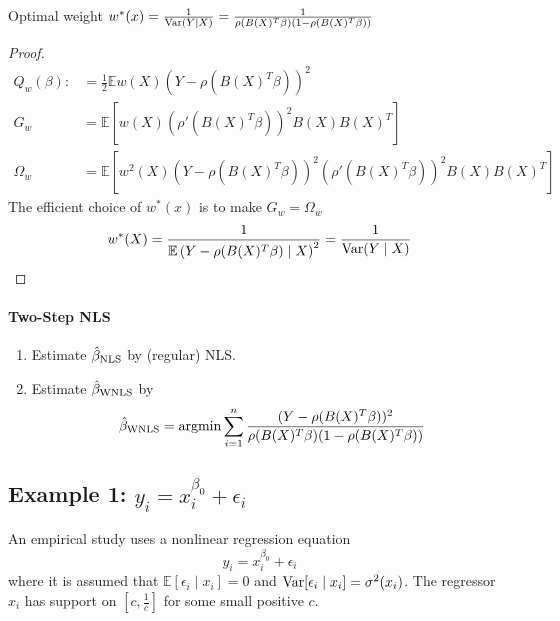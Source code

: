 \documentclass[11pt]{elegantbook}
\newcommand{\argmin}{\operatornamewithlimits{argmin}}
\begin{document}
\begin{claim}
    Optimal weight $w^*(x)=\frac{1}{\textnormal{Var}(Y|X)}=\frac{1}{\rho(B(X)^T\beta)(1-\rho(B(X)^T\beta))}$
\end{claim}
\begin{proof}
    \begin{equation}
        \begin{aligned}
            Q_w(\beta):&=\frac{1}{2}\mathbb{E}w(X)(Y-\rho(B(X)^T\beta))^2\\
            G_w&=\mathbb{E}\left[w(X)(\rho'(B(X)^T\beta))^2B(X)B(X)^T\right]\\
            \Omega_w&=\mathbb{E}\left[w^2(X)\left(Y-\rho(B(X)^T\beta)\right)^2\left(\rho'(B(X)^T\beta)\right)^2B(X)B(X)^T\right]
        \end{aligned}
        \nonumber
    \end{equation}
    The efficient choice of $w^*(x)$ is to make $G_w=\Omega_w$
    \begin{equation}
        \begin{aligned}
            w^*(X)=\frac{1}{\mathbb{E}\left(Y-\rho(B(X)^T\beta)\mid X\right)^2}=\frac{1}{\textnormal{Var}(Y\mid X)}
        \end{aligned}
        \nonumber
    \end{equation}
\end{proof}

\paragraph*{Two-Step NLS}
\begin{enumerate}
    \item Estimate $\hat{\beta}_\textnormal{NLS}$ by (regular) NLS.
    \item Estimate $\hat{\beta}_\textnormal{WNLS}$ by
    \begin{equation}
        \begin{aligned}
            \hat{\beta}_\textnormal{WNLS}=\argmin \sum_{i=1}^n \frac{(Y-\rho(B(X)^T\beta))^2}{\rho(B(X)^T\beta)(1-\rho(B(X)^T\beta))}
        \end{aligned}
        \nonumber
    \end{equation}
\end{enumerate}

\subsection{Example 1: $y_i=x_i^{\beta_0}+\epsilon_i$}
An empirical study uses a nonlinear regression equation $$y_i=x_i^{\beta_0}+\epsilon_i$$
where it is assumed that $\mathbb{E}[\epsilon_i\mid x_i]=0$ and $\textnormal{Var}[\epsilon_i\mid x_i]=\sigma^2(x_i)$. The regressor $x_i$ has support on $[c,\frac{1}{c}]$ for some small positive $c$.
\end{document}
